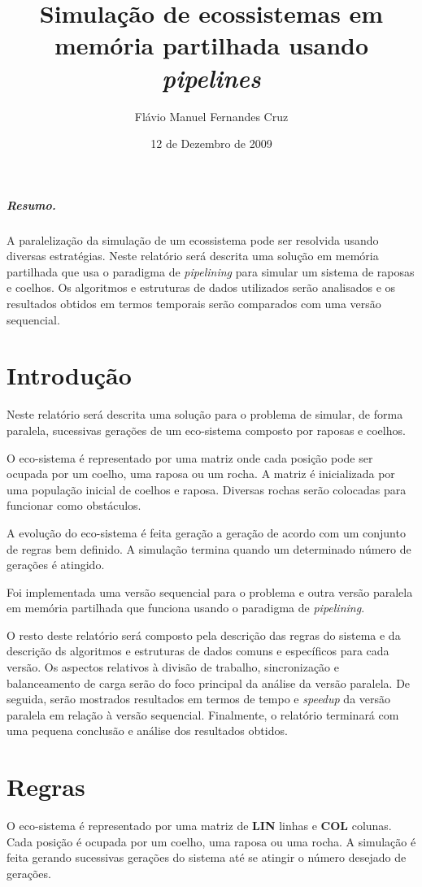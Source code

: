 \documentclass[12pt]{article}
\title{\bfseries Simulação de ecossistemas em memória partilhada usando \textit{pipelines}}
\author{Flávio Manuel Fernandes Cruz}
\date{12 de Dezembro de 2009}
\begin{document}
\maketitle

\subparagraph{Resumo.} A paralelização da simulação de um ecossistema pode ser resolvida usando diversas estratégias.
Neste relatório
será descrita uma solução em memória partilhada que usa o paradigma de \textit{pipelining} para simular um sistema
de raposas e coelhos. Os algoritmos e estruturas de dados utilizados serão analisados e os resultados
obtidos em termos temporais serão comparados com uma versão sequencial.

\section{Introdução}

Neste relatório será descrita uma solução para o problema de simular, de forma paralela,
sucessivas gerações de um eco-sistema composto por raposas e coelhos.

O eco-sistema é representado por uma matriz onde
cada posição pode ser ocupada por um coelho, uma raposa ou um rocha.
A matriz é inicializada por uma população inicial de coelhos e raposa.
Diversas rochas serão colocadas para funcionar como obstáculos.

A evolução do eco-sistema é feita geração a geração de acordo com um conjunto de regras bem definido.
A simulação termina quando um determinado número de gerações é atingido.

Foi implementada uma versão sequencial para o problema e outra versão paralela em memória partilhada
que funciona usando o paradigma de \textit{pipelining}.

O resto deste relatório será composto pela descrição das regras do sistema e da descrição
ds algoritmos e estruturas de dados comuns e específicos para cada versão.
Os aspectos relativos à divisão de trabalho, sincronização e balanceamento de carga
serão do foco principal da análise da versão paralela.
De seguida, serão mostrados resultados em termos de tempo
e \textit{speedup} da versão paralela em relação à versão sequencial. Finalmente,
o relatório terminará com uma pequena conclusão e análise dos resultados obtidos.

\section{Regras}

O eco-sistema é representado por uma matriz de \textbf{LIN} linhas e \textbf{COL} colunas.
Cada posição é ocupada por um coelho, uma raposa ou uma rocha.
A simulação é feita gerando sucessivas gerações do sistema até se atingir o número
desejado de gerações.
\end{document}
